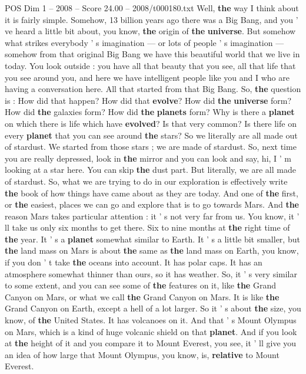 \begin{textsample}{POS Dim 1 – 2008 – Score 24.00 – 2008/t000180.txt}
Well, \textbf{the} way I think about it is fairly simple.
Somehow, 13 billion years ago there was a Big Bang, and you ' ve heard a little bit about, you know, \textbf{the} origin of \textbf{the} \textbf{universe}.
But somehow what strikes everybody ' s imagination — or lots of people ' s imagination — somehow from that original Big Bang we have this beautiful world that we live in today.
You look outside : you have all that beauty that you see, all that life that you see around you, and here we have intelligent people like you and I who are having a conversation here.
All that started from that Big Bang.
So, \textbf{the} question is : How did that happen?
How did that \textbf{evolve}?
How did \textbf{the} \textbf{universe} form?
How did \textbf{the} galaxies form?
How did \textbf{the} \textbf{planets} form?
Why is there a \textbf{planet} on which there is life which have \textbf{evolved}?
Is that very common?
Is there life on every \textbf{planet} that you can see around \textbf{the} stars?
So we literally are all made out of stardust.
We started from those stars ; we are made of stardust.
So, next time you are really depressed, look in \textbf{the} mirror and you can look and say, hi, I ' m looking at a star here.
You can skip \textbf{the} dust part.
But literally, we are all made of stardust.
So, what we are trying to do in our exploration is effectively write \textbf{the} book of how things have came about as they are today.
And one of \textbf{the} first, or \textbf{the} easiest, places we can go and explore that is to go towards Mars.
And \textbf{the} reason Mars takes particular attention : it ' s not very far from us.
You know, it ' ll take us only six months to get there.
Six to nine months at \textbf{the} right time of \textbf{the} year.
It ' s a \textbf{planet} somewhat similar to Earth.
It ' s a little bit smaller, but \textbf{the} land mass on Mars is about \textbf{the} same as \textbf{the} land mass on Earth, you know, if you don ' t take \textbf{the} oceans into account.
It has polar caps.
It has an atmosphere somewhat thinner than ours, so it has weather.
So, it ' s very similar to some extent, and you can see some of \textbf{the} features on it, like \textbf{the} Grand Canyon on Mars, or what we call \textbf{the} Grand Canyon on Mars.
It is like \textbf{the} Grand Canyon on Earth, except a hell of a lot larger.
So it ' s about \textbf{the} size, you know, of \textbf{the} United States.
It has volcanoes on it.
And that ' s Mount Olympus on Mars, which is a kind of huge volcanic shield on that \textbf{planet}.
And if you look at \textbf{the} height of it and you compare it to Mount Everest, you see, it ' ll give you an idea of how large that Mount Olympus, you know, is, \textbf{relative} to Mount Everest.

\end{textsample}
